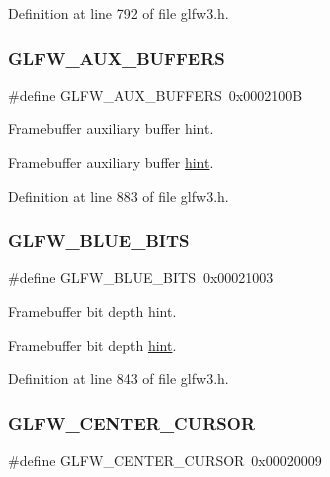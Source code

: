 Definition at line 792 of file glfw3.\+h.

\mbox{\label{group__window_gab05108c5029443b371112b031d1fa174}} 
\subsubsection{\texorpdfstring{GLFW\_AUX\_BUFFERS}{GLFW\_AUX\_BUFFERS}}
{\footnotesize\ttfamily \#define G\+L\+F\+W\+\_\+\+A\+U\+X\+\_\+\+B\+U\+F\+F\+E\+RS~0x0002100B}



Framebuffer auxiliary buffer hint. 

Framebuffer auxiliary buffer \mbox{\hyperlink{group__window_gab05108c5029443b371112b031d1fa174}{hint}}. 

Definition at line 883 of file glfw3.\+h.

\mbox{\label{group__window_gab292ea403db6d514537b515311bf9ae3}} 
\subsubsection{\texorpdfstring{GLFW\_BLUE\_BITS}{GLFW\_BLUE\_BITS}}
{\footnotesize\ttfamily \#define G\+L\+F\+W\+\_\+\+B\+L\+U\+E\+\_\+\+B\+I\+TS~0x00021003}



Framebuffer bit depth hint. 

Framebuffer bit depth \mbox{\hyperlink{group__window_gab292ea403db6d514537b515311bf9ae3}{hint}}. 

Definition at line 843 of file glfw3.\+h.

\mbox{\label{group__window_ga5ac0847c0aa0b3619f2855707b8a7a77}} 
\subsubsection{\texorpdfstring{GLFW\_CENTER\_CURSOR}{GLFW\_CENTER\_CURSOR}}
{\footnotesize\ttfamily \#define G\+L\+F\+W\+\_\+\+C\+E\+N\+T\+E\+R\+\_\+\+C\+U\+R\+S\+OR~0x00020009}



